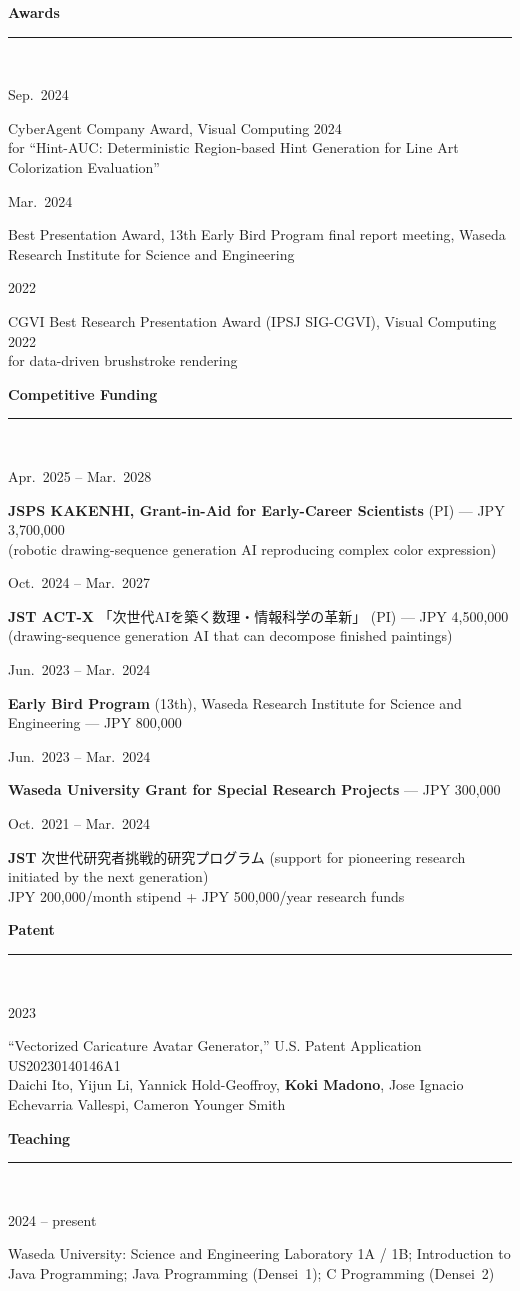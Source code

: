 \documentclass[10pt,a4paper]{article}
\newcommand{\jp}[1]{{\jpfont #1}}
\newcommand{\cvsection}[1]{%
  \vspace{9pt}%
  {\large\bfseries\color{accent}#1}\\[-9pt]
  {\color{lightblue}\rule{\textwidth}{0.9pt}}\\[2pt]%
}
\newcommand{\cvline}[2]{%
  \noindent\begin{minipage}[t]{3.15cm}\strut\small\color{mutedc}#1\end{minipage}%
  \hspace{0.3cm}%
  \begin{minipage}[t]{\dimexpr\textwidth-3.45cm\relax}\strut #2\end{minipage}\par\vspace{3.5pt}%
}
\begin{document}
\cvsection{Awards}
\cvline{Sep.~2024}{CyberAgent Company Award, Visual Computing 2024 \\{\small\color{mutedc}for ``Hint-AUC: Deterministic Region-based Hint Generation for Line Art Colorization Evaluation''}}
\cvline{Mar.~2024}{Best Presentation Award, 13th Early Bird Program final report meeting, Waseda Research Institute for Science and Engineering}
\cvline{2022}{CGVI Best Research Presentation Award (IPSJ SIG-CGVI), Visual Computing 2022 \\{\small\color{mutedc}for data-driven brushstroke rendering}}

\cvsection{Competitive Funding}
\cvline{Apr.~2025 -- Mar.~2028}{\textbf{JSPS KAKENHI, Grant-in-Aid for Early-Career Scientists} (PI) --- JPY 3,700,000 \\{\small\color{mutedc}\jp{複雑な色表現を再現可能なロボット描画系列生成AIの構築} (robotic drawing-sequence generation AI reproducing complex color expression)}}
\cvline{Oct.~2024 -- Mar.~2027}{\textbf{JST ACT-X} \jp{「次世代AIを築く数理・情報科学の革新」} (PI) --- JPY 4,500,000 \\{\small\color{mutedc}\jp{完成絵を分解可能な描画系列生成AIの構築} (drawing-sequence generation AI that can decompose finished paintings)}}
\cvline{Jun.~2023 -- Mar.~2024}{\textbf{Early Bird Program} (13th), Waseda Research Institute for Science and Engineering --- JPY 800,000}
\cvline{Jun.~2023 -- Mar.~2024}{\textbf{Waseda University Grant for Special Research Projects} --- JPY 300,000}
\cvline{Oct.~2021 -- Mar.~2024}{\textbf{JST} \jp{次世代研究者挑戦的研究プログラム} (support for pioneering research initiated by the next generation) \\{\small\color{mutedc}JPY 200,000/month stipend + JPY 500,000/year research funds}}

\cvsection{Patent}
\cvline{2023}{``Vectorized Caricature Avatar Generator,'' U.S. Patent Application US20230140146A1 \\{\small\color{mutedc}Daichi Ito, Yijun Li, Yannick Hold-Geoffroy, \textbf{Koki Madono}, Jose Ignacio Echevarria Vallespi, Cameron Younger Smith}}

\cvsection{Teaching}
\cvline{2024 -- present}{Waseda University: Science and Engineering Laboratory 1A / 1B; Introduction to Java Programming; Java Programming (Densei~1); C Programming (Densei~2)}
\end{document}
